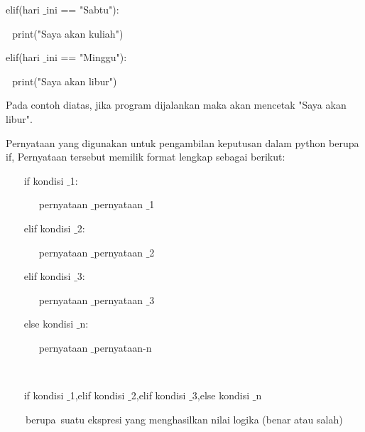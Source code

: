 elif(hari $  \_  $ini == "Sabtu"): \par
\noindent 
\vspace{\baselineskip}
 $  $  $  $ print("Saya akan kuliah") \par
\noindent 
\vspace{\baselineskip}
elif(hari $  \_  $ini == "Minggu"): \par
\noindent 
\vspace{\baselineskip}
 $  $  $  $ print("Saya akan libur") \par
\noindent 
\vspace{\baselineskip}
\vspace{\baselineskip}
Pada contoh diatas, jika program dijalankan maka akan mencetak $  
$"Saya akan libur". \par
\noindent 
 $  $Pernyataan yang digunakan untuk pengambilan keputusan dalam python berupa if, Pernyataan tersebut memilik format lengkap sebagai berikut: \par
\vspace{12pt}
\noindent 
~~~ if kondisi $  \_  $1: \par
\vspace{12pt}
\noindent 
~~~~~~ pernyataan $  \_  $pernyataan $  \_  $1 \par
\vspace{12pt}
\noindent 
~~~ elif kondisi $  \_  $2: \par
\vspace{12pt}
\noindent 
~~~~~~ pernyataan $  \_  $pernyataan $  \_  $2 \par
\vspace{12pt}
\noindent 
~~~ elif kondisi $  \_  $3: \par
\vspace{12pt}
\noindent 
~~~~~~ pernyataan $  \_  $pernyataan $  \_  $3 \par
\vspace{12pt}
\noindent 
~~~ else kondisi $  \_  $n: \par
\vspace{12pt}
\noindent 
~~~~~~ pernyataan $  \_  $pernyataan-n \par
\vspace{12pt}
\noindent 
~~~~~~  \par
\noindent 
~~~ if kondisi $  \_  $1,elif kondisi $  \_  $2,elif kondisi $  \_  $3,else kondisi $  \_  $n \par
\vspace{12pt}
\noindent 
~~~~berupa~suatu ekspresi yang menghasilkan nilai logika (benar atau salah)    \par
